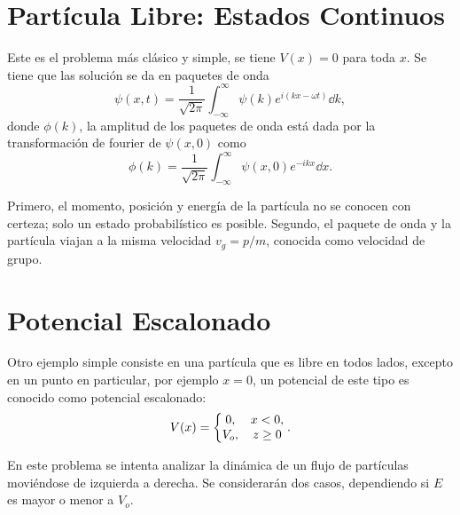\section{Partícula Libre: Estados Continuos}
Este es el problema más clásico y simple, se tiene $V(x) = 0$ para toda $x$. Se tiene que las solución se da en paquetes de onda
    \begin{equation*}
        \psi (x,t) = \frac{1}{\sqrt{2\pi}} \int _{-\infty} ^\infty \psi (k) e^{i(kx - \omega t)} \dd{k},
    \end{equation*}
donde $\phi (k)$, la amplitud de los paquetes de onda está dada por la transformación de fourier de $\psi (x,0)$ como
    \begin{equation*}
        \phi (k) = \frac{1}{\sqrt{2\pi}} \int _{-\infty} ^\infty \psi (x,0) e^{-ikx} \dd{x}.
    \end{equation*}

Primero, el momento, posición y energía de la partícula no se conocen con certeza; solo un estado probabilístico es posible. Segundo, el paquete de onda y la partícula viajan a la misma velocidad $v_g = p/m$, conocida como velocidad de grupo.


\section{Potencial Escalonado}
Otro ejemplo simple consiste en una partícula que es libre en todos lados, excepto en un punto en particular, por ejemplo $x = 0$, un potencial de este tipo es conocido como potencial escalonado:
\begin{equation}
    V(x) = \left\{ \mqty{0, & x<0,\\ V_o, & z\geq 0} \right. .
\end{equation}

En este problema se intenta analizar la dinámica de un flujo de partículas moviéndose de izquierda a derecha. Se considerarán dos casos, dependiendo si $E$ es mayor o menor a $V_o$.

